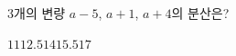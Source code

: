 3개의 변량 $a-5$, $a+1$, $a+4$의 분산은?
\begin{choices32}{$11$}{$12.5$}{$14$}{$15.5$}{$17$}\end{choices32}
